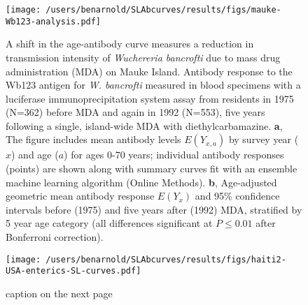 \documentclass[11pt]{article}
\begin{document}
\begin{figure}[htbp]
\begin{center}
\begin{minipage}{\textwidth}
\label{fig:garki}
\end{minipage}
\end{center}
\end{figure}



\begin{figure}[htbp]
\begin{center}
\texttt{[image: /users/benarnold/SLAbcurves/results/figs/mauke-Wb123-analysis.pdf]}
\begin{minipage}{\textwidth}
\caption{A shift in the age-antibody curve measures a reduction in transmission intensity of \textit{Wuchereria bancrofti} due to mass drug administration (MDA) on Mauke Island.  Antibody response to the Wb123 antigen for \textit{W. bancrofti} measured in blood specimens with a luciferase immunoprecipitation system assay from residents in 1975 (N=362) before MDA and again in 1992 (N=553), five years following a single, island-wide MDA with diethylcarbamazine. \textbf{a}, The figure includes mean antibody levels $E(Y_{x,a})$ by survey year ($x$) and age ($a$) for ages 0-70 years; individual antibody responses (points) are shown along with summary curves fit with an ensemble machine learning algorithm (Online Methods). \textbf{b}, Age-adjusted geometric mean antibody response $E(Y_{x})$ and 95\% confidence intervals before (1975) and five years after (1992) MDA, stratified by 5 year age category (all differences significant at $P\leq0.01$ after Bonferroni correction).  }
\label{fig:mauke}
\end{minipage}
\end{center}
\end{figure}


\begin{figure}[htbp]
\begin{center}
\texttt{[image: /users/benarnold/SLAbcurves/results/figs/haiti2-USA-enterics-SL-curves.pdf]}
\begin{minipage}{\textwidth}
\caption{caption on the next page}
\label{fig:enterics}
\end{minipage}
\end{center}
\end{figure}
\end{document}
